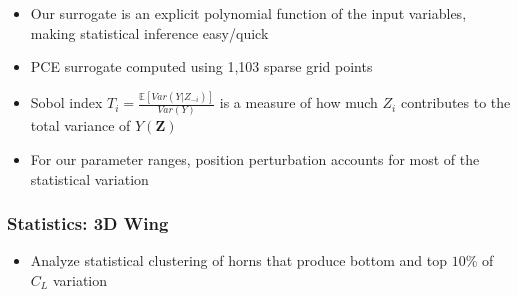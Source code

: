 \documentclass[9pt]{beamer}
\newcommand{\bv}[1]{\mathbf{#1}}
\begin{document}
\begin{frame}
\begin{itemize}
\item Our surrogate is an explicit polynomial function of the input
  variables, making statistical inference easy/quick
\item PCE surrogate computed using 1,103 sparse grid points
\item Sobol index $T_i = \frac{\mathbb{E}\left[ Var\left(
  Y|Z_{-i}\right)\right]}{Var\left( Y\right)}$ is a measure of how much
  $Z_i$ contributes to the total variance of $Y(\bv{Z})$
\item For our parameter ranges, position perturbation accounts for most of
  the statistical variation
\end{itemize}
\end{frame}
\begin{frame}
\frametitle{Statistics: 3D Wing}
\label{sec-3-9}


\begin{itemize}
\item Analyze statistical clustering of horns that produce bottom and top
  $10\%$ of $C_L$ variation
\end{itemize}


\end{frame}
\end{document}
